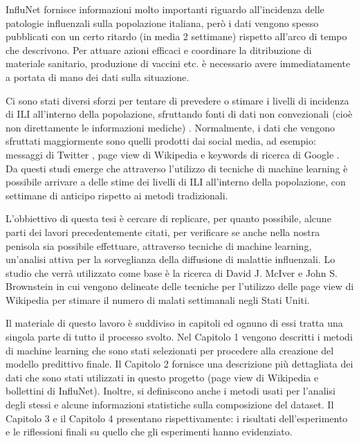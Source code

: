 InfluNet fornisce informazioni molto importanti riguardo all'incidenza delle patologie influenzali sulla popolazione
italiana, però i dati vengono spesso pubblicati con un certo ritardo (in media 2 settimane) rispetto all'arco di tempo che 
descrivono. Per attuare azioni efficaci e coordinare la ditribuzione di materiale sanitario, produzione di vaccini etc. è 
necessario avere immediatamente a portata di mano dei dati sulla situazione. 
\bigskip

Ci sono stati diversi sforzi per tentare di prevedere o stimare i livelli di incidenza di ILI all'interno della popolazione,
sfruttando fonti di dati non convezionali (cioè non direttamente le informazioni mediche) \cite{McIver2014, Hickmann2015, Generous2014, googleflutrends, Signorini2011}. Normalmente, i dati che vengono sfruttati 
maggiormente sono quelli prodotti dai social media, ad esempio: messaggi di Twitter \cite{Signorini2011}, page view di 
Wikipedia \cite{McIver2014, Hickmann2015, Generous2014} e keywords di ricerca di Google \cite{googleflutrends}. Da questi 
studi emerge che attraverso l'utilizzo di tecniche di machine learning è possibile arrivare a delle stime dei livelli di ILI 
all'interno della popolazione, con settimane di anticipo rispetto ai metodi tradizionali.
\bigskip

L'obbiettivo di questa tesi è cercare di replicare, per quanto possibile, alcune parti dei lavori precedentemente citati, per
verificare se anche nella nostra penisola sia possibile effettuare, attraverso tecniche di machine learning, un'analisi
attiva per la sorveglianza della diffusione di malattie influenzali. Lo studio che verrà utilizzato come base 
è la ricerca di David J. McIver e John S. Brownstein \cite{McIver2014} in cui vengono delineate delle tecniche per 
l'utilizzo delle page view di Wikipedia per stimare il numero di malati settimanali negli Stati Uniti.
\bigskip

Il materiale di questo lavoro è suddiviso in capitoli ed ognuno di essi tratta una singola parte di tutto il processo svolto. 
Nel Capitolo 1 vengono descritti i metodi di machine learning che sono stati selezionati per procedere alla creazione
del modello predittivo finale.
Il Capitolo 2 fornisce una descrizione più dettagliata dei dati che sono stati utilizzati in questo progetto
(page view di Wikipedia e bollettini di InfluNet). Inoltre, si definiscono anche i metodi usati per l'analisi degli stessi e 
alcune informazioni statistiche sulla composizione del dataset.
Il Capitolo 3 e il Capitolo 4 presentano rispettivamente: i risultati dell'esperimento e le riflessioni finali su quello che
gli esperimenti hanno evidenziato.
\newpage




